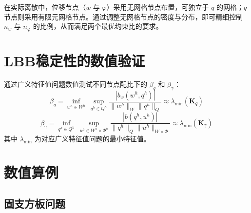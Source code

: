 \documentclass[internationalmaster]{hquThesis}
\begin{document}
在实际离散中，位移节点（$w$ 与 $\varphi$）采用无网格节点布置，可独立于 $q$ 的网格；$q$ 节点则采用有限元网格节点。通过调整无网格节点的密度与分布，即可精细控制 $n_w$ 与 $n_\varphi$ 的比例，从而满足两个最优约束比的要求。

\section{LBB稳定性的数值验证}

通过广义特征值问题数值测试不同节点配比下的 $\beta_q$ 和 $\beta_\gamma$：
\begin{equation}
    \beta_q = \inf_{w^{h}\in W^{h}}\ \sup_{q^{h}\in Q^{h}}
    \frac{|b_w(w^{h},q^{h})|}{\| w^{h}\|_W\| q^{h}\|_Q}
    \approx \lambda_{\min}(\boldsymbol K_q)
    \label{eq:num-betaq}
\end{equation}
\begin{equation}
    \beta_\gamma = \inf_{q^{h}\in Q^{h}}\ \sup_{u^{h}\in W^{h}\times\Phi^{h}}
    \frac{|b(q^{h},u^{h})|}{\| q^{h}\|_Q\| u^{h}\|_{W\times\Phi}}
    \approx \lambda_{\min}(\boldsymbol K_\gamma)
    \label{eq:num-betagamma}
\end{equation}
其中 $\lambda_{\min}$ 为对应广义特征值问题的最小特征值。

\section{数值算例}

\subsection{固支方板问题}
\end{document}
